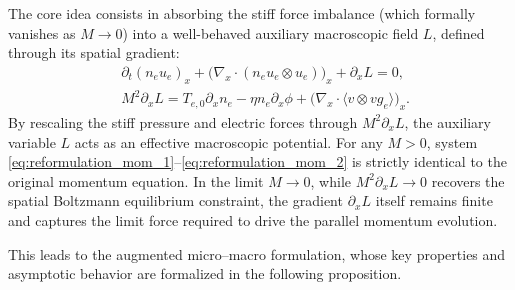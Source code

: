\documentclass[pdflatex,final,10pt]{article}
\begin{document}
The core idea consists in absorbing the stiff force imbalance (which formally vanishes as $M \to 0$) into a well-behaved auxiliary macroscopic field $L$, defined through its spatial gradient:
\begin{align}
    &\partial_{t}(n_e u_e)_x + \big(\nabla_{x}\cdot(n_e u_e\otimes u_e)\big)_x + \partial_x L = 0, \label{eq:reformulation_mom_1}\\
    &M^2 \partial_x L = T_{e,0}\partial_{x}n_e - \eta n_e\partial_{x}\phi + \big(\nabla_{x}\cdot\langle v\otimes v g_{e}\rangle\big)_x. \label{eq:reformulation_mom_2}
\end{align}
By rescaling the stiff pressure and electric forces through $M^2 \partial_x L$, the auxiliary variable $L$ acts as an effective macroscopic potential. For any $M > 0$, system \eqref{eq:reformulation_mom_1}--\eqref{eq:reformulation_mom_2} is strictly identical to the original momentum equation. In the limit $M \to 0$, while $M^2 \partial_x L \to 0$ recovers the spatial Boltzmann equilibrium constraint, the gradient $\partial_x L$ itself remains finite and captures the limit force required to drive the parallel momentum evolution.

This leads to the augmented micro--macro formulation, whose key properties and asymptotic behavior are formalized in the following proposition.
\end{document}
